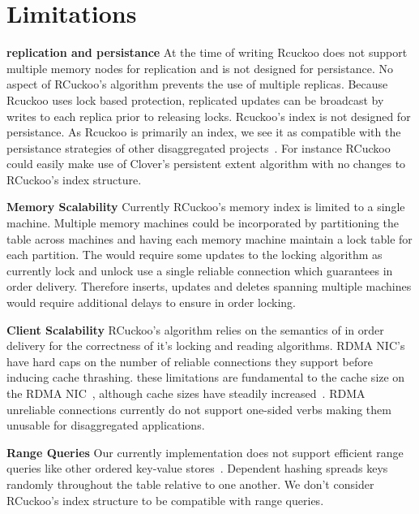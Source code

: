 \section{Limitations}
\label{sec:limations}

\textbf{replication and persistance} At the time of
writing Rcuckoo does not support multiple memory nodes for
replication and is not designed for persistance. No aspect
of RCuckoo's algorithm prevents the use of multiple
replicas. Because Rcuckoo uses lock based protection,
replicated updates can be broadcast by writes to each
replica prior to releasing locks. Rcuckoo's index is not
designed for persistance. As Rcuckoo is primarily an index,
we see it as compatible with the persistance strategies of
other disaggregated projects~\cite{clover}. For instance
RCuckoo could easily make use of Clover's persistent extent
algorithm with no changes to RCuckoo's index structure.

\textbf{Memory Scalability} Currently RCuckoo's memory index
is limited to a single machine. Multiple memory machines
could be incorporated by partitioning the table across
machines and having each memory machine maintain a lock
table for each partition. The would require some updates to
the locking algorithm as currently lock and unlock use a
single reliable connection which guarantees in order
delivery. Therefore inserts, updates and deletes spanning
multiple machines would require additional delays to ensure
in order locking.

\textbf{Client Scalability} RCuckoo's algorithm relies on
the semantics of in order delivery for the correctness of
it's locking and reading algorithms. RDMA NIC's have hard
caps on the number of reliable connections they support
before inducing cache thrashing. these limitations are
fundamental to the cache size on the RDMA
NIC~\cite{erpc,faast,one-rma}, although cache sizes have
steadily increased~\cite{storm}. RDMA unreliable connections
currently do not support one-sided verbs making them
unusable for disaggregated applications.

\textbf{Range Queries} Our currently implementation does
not support efficient range queries like other ordered
key-value stores~\cite{sherman,rolex}. Dependent hashing
spreads keys randomly throughout the table relative to one
another. We don't consider RCuckoo's index structure to be
compatible with range queries.
